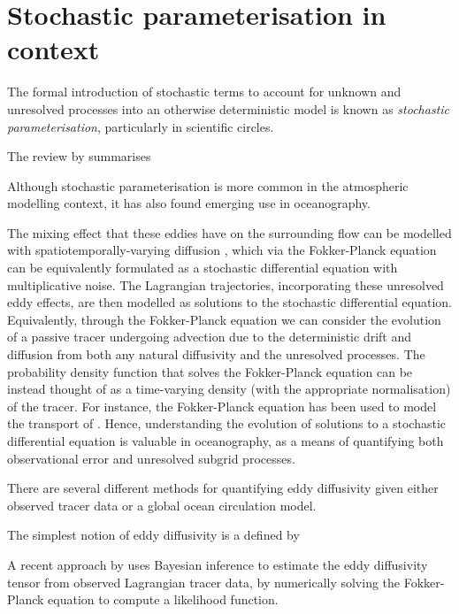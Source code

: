 \section{Stochastic parameterisation in context}


The formal introduction of stochastic terms to account for unknown and unresolved processes into an otherwise deterministic model is known as \emph{stochastic parameterisation}, particularly in scientific circles.




The review by \citet{BernerEtAl_2017_StochasticParameterizationNew} summarises



Although stochastic parameterisation is more common in the atmospheric modelling context, it has also found emerging use in oceanography.

The mixing effect that these eddies have on the surrounding flow can be modelled with spatiotemporally-varying diffusion \citehere, which via the Fokker-Planck equation can be equivalently formulated as a stochastic differential equation with multiplicative noise.
The Lagrangian trajectories, incorporating these unresolved eddy effects, are then modelled as solutions to the stochastic differential equation.
Equivalently, through the Fokker-Planck equation we can consider the evolution of a passive tracer undergoing advection due to the deterministic drift and diffusion from both any natural diffusivity and the unresolved processes.
The probability density function that solves the Fokker-Planck equation can be instead thought of as a time-varying density (with the appropriate normalisation) of the tracer.
For instance, the Fokker-Planck equation has been used to model the transport of \citehere.
Hence, understanding the evolution of solutions to a stochastic differential equation is valuable in oceanography, as a means of quantifying both observational error and unresolved subgrid processes.


There are several different methods for quantifying eddy diffusivity given either observed tracer data or a global ocean circulation model.

The simplest notion of eddy diffusivity is a defined by






A recent approach by \cite{YingEtAl_2019_BayesianInferenceOcean} uses Bayesian inference to estimate the eddy diffusivity tensor from observed Lagrangian tracer data, by numerically solving the Fokker-Planck equation to compute a likelihood function.




